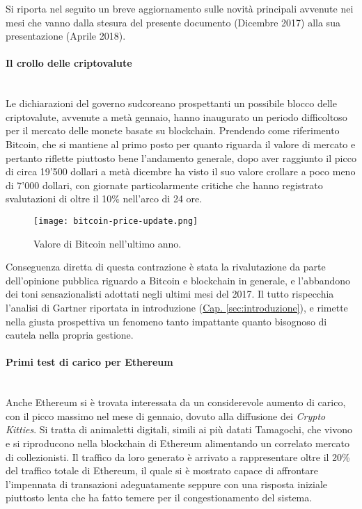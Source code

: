 Si riporta nel seguito un breve aggiornamento sulle novità principali avvenute nei mesi che vanno dalla stesura del presente documento (Dicembre 2017) alla sua presentazione (Aprile 2018).

\paragraph{Il crollo delle criptovalute} ~ \\
    Le dichiarazioni del governo sudcoreano prospettanti un possibile blocco delle criptovalute, avvenute a metà gennaio, hanno inaugurato un periodo difficoltoso per il mercato delle monete basate su blockchain. Prendendo come riferimento Bitcoin, che si mantiene al primo posto per quanto riguarda il valore di mercato e pertanto riflette piuttosto bene l'andamento generale, dopo aver raggiunto il picco di circa 19'500 dollari a metà dicembre ha visto il suo valore crollare a poco meno di 7'000 dollari, con giornate particolarmente critiche che hanno registrato svalutazioni di oltre il 10\% nell'arco di 24 ore.

    \begin{figure}[ht]
        \centering
        \texttt{[image: bitcoin-price-update.png]}
        \caption[Valore di Bitcoin nell'ultimo anno]{Valore di Bitcoin nell'ultimo anno.}
        \label{fig:bitcoin-price-update}
    \end{figure}

    Conseguenza diretta di questa contrazione è stata la rivalutazione da parte dell'opinione pubblica riguardo a Bitcoin e blockchain in generale, e l'abbandono dei toni sensazionalisti adottati negli ultimi mesi del 2017. Il tutto rispecchia l'analisi di Gartner riportata in introduzione (\hyperref[sec:introduzione]{Cap. \ref*{sec:introduzione}}), e rimette nella giusta prospettiva un fenomeno tanto impattante quanto bisognoso di cautela nella propria gestione.

\paragraph{Primi test di carico per Ethereum} ~ \\
    Anche Ethereum si è trovata interessata da un considerevole aumento di carico, con il picco massimo nel mese di gennaio, dovuto alla diffusione dei \emph{Crypto Kitties}. Si tratta di animaletti digitali, simili ai più datati Tamagochi, che vivono e si riproducono nella blockchain di Ethereum alimentando un correlato mercato di collezionisti. Il traffico da loro generato è arrivato a rappresentare oltre il 20\% del traffico totale di Ethereum, il quale si è mostrato capace di affrontare l'impennata di transazioni adeguatamente seppure con una risposta iniziale piuttosto lenta che ha fatto temere per il congestionamento del sistema.

